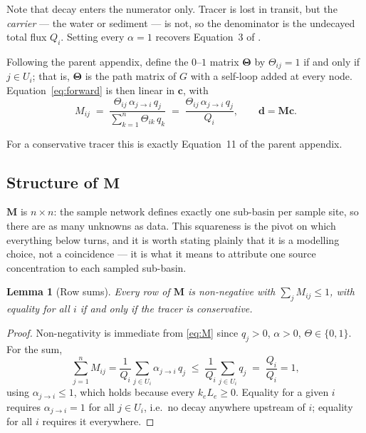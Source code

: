 \documentclass[11pt]{article}
\newcommand{\cvec}{\ensuremath{\mathbf{c}}\xspace}
\newcommand{\dvec}{\ensuremath{\mathbf{d}}\xspace}
\newcommand{\Mmat}{\ensuremath{\mathbf{M}}\xspace}
\newtheorem{lemma}[theorem]{Lemma}
\theoremstyle{definition}
\begin{document}
\noindent Note that decay enters the numerator only. Tracer is lost in transit, but the
\textit{carrier} --- the water or sediment --- is not, so the denominator is the undecayed
total flux $Q_i$. Setting every $\alpha = 1$ recovers Equation~3 of \textcite{barnes_using_2024}.

Following the parent appendix, define the $0$--$1$ matrix $\bm{\Theta}$ by $\Theta_{ij} = 1$
if and only if $j \in U_i$; that is, $\bm{\Theta}$ is the path matrix of $G$ with a self-loop
added at every node. Equation~\eqref{eq:forward} is then linear in \cvec, with
\begin{equation}
  \boxed{\;
  M_{ij} \;=\; \frac{\Theta_{ij}\, \alpha_{j \to i}\, q_j}
                    {\sum_{k=1}^{n} \Theta_{ik}\, q_k}
             \;=\; \frac{\Theta_{ij}\, \alpha_{j \to i}\, q_j}{Q_i} ,
  \qquad \dvec = \Mmat \cvec .
  \;}
  \label{eq:M}
\end{equation}

\noindent For a conservative tracer this is exactly Equation~11 of the parent appendix.

\subsection{Structure of \texorpdfstring{$\Mmat$}{M}}

$\Mmat$ is $n \times n$: the sample network defines exactly one sub-basin per sample site, so
there are as many unknowns as data. This squareness is the pivot on which everything below
turns, and it is worth stating plainly that it is a modelling choice, not a coincidence --- it
is what it means to attribute one source concentration to each sampled sub-basin.

\begin{lemma}[Row sums]\label{lem:stochastic}
Every row of $\Mmat$ is non-negative with $\sum_j M_{ij} \le 1$, with equality for all $i$ if
and only if the tracer is conservative.
\end{lemma}

\begin{proof}
Non-negativity is immediate from \eqref{eq:M} since $q_j > 0$, $\alpha > 0$, $\Theta \in
\{0,1\}$. For the sum,
\[
  \sum_{j=1}^n M_{ij}
  = \frac{1}{Q_i}\sum_{j \in U_i} \alpha_{j\to i}\, q_j
  \;\le\; \frac{1}{Q_i} \sum_{j \in U_i} q_j
  \;=\; \frac{Q_i}{Q_i} = 1 ,
\]
using $\alpha_{j \to i} \le 1$, which holds because every $k_e L_e \ge 0$. Equality for a
given $i$ requires $\alpha_{j \to i} = 1$ for all $j \in U_i$, i.e.\ no decay anywhere
upstream of $i$; equality for all $i$ requires it everywhere.
\end{proof}
\end{document}
